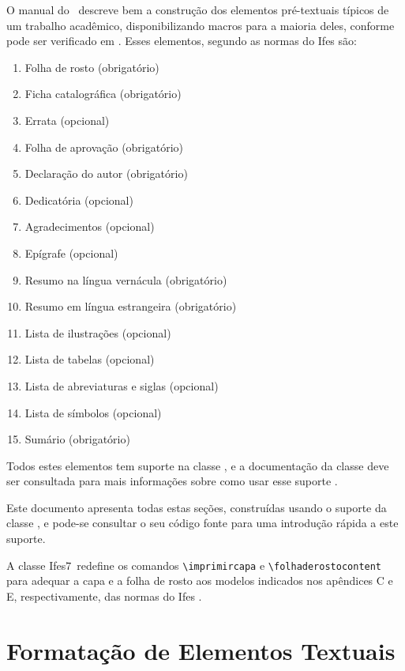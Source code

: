 \documentclass[times,english,brazil,oneside]{ifes7}
\newcommand{\ifestex}{\textsf{Ifes$7$}}
\begin{document}
O manual do \abnTeX\ descreve bem a construção dos elementos
pré-textuais típicos de um trabalho acadêmico, disponibilizando macros
para a maioria deles, conforme pode ser verificado em
\cite[cap.~6]{Araujo2016}. Esses elementos, segundo as normas do Ifes
são:

\begin{enumerate}
\item Folha de rosto (obrigatório)
\item Ficha catalográfica (obrigatório)
\item Errata (opcional)
\item Folha de aprovação (obrigatório)
\item Declaração do autor (obrigatório)
\item Dedicatória (opcional)
\item Agradecimentos (opcional)
\item Epígrafe (opcional)
\item Resumo na língua vernácula (obrigatório)
\item Resumo em língua estrangeira (obrigatório)
\item Lista de ilustrações (opcional)
\item Lista de tabelas (opcional)
\item Lista de abreviaturas e siglas (opcional)
\item Lista de símbolos (opcional)
\item Sumário (obrigatório)
\end{enumerate}

Todos estes elementos tem suporte na classe \abnTeX, e a documentação
da classe deve ser consultada para mais informações sobre como usar
esse suporte \cite{Araujo2016}.

Este documento apresenta todas estas seções, construídas usando o
suporte da classe \abnTeX, e pode-se consultar o seu código fonte para
uma introdução rápida a este suporte.

A classe \ifestex\ redefine os comandos \verb!\imprimircapa! e
\verb!\folhaderostocontent! para adequar a capa e a folha de rosto aos
modelos indicados nos apêndices C e E, respectivamente, das normas do
Ifes \cite{Ifes2014}.



\chapter{Formatação de Elementos Textuais}
\label{cha:format-text}
\end{document}
